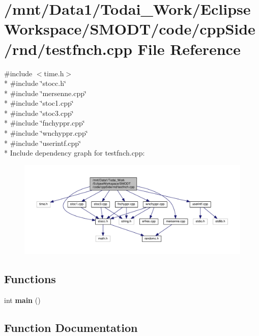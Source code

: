 \section{/mnt/\-Data1/\-Todai\-\_\-\-Work/\-Eclipse\-Workspace/\-S\-M\-O\-D\-T/code/cpp\-Side/rnd/testfnch.cpp File Reference}
\label{rnd_2testfnch_8cpp}
{\ttfamily \#include $<$time.\-h$>$}\\*
{\ttfamily \#include \char`\"{}stocc.\-h\char`\"{}}\\*
{\ttfamily \#include \char`\"{}mersenne.\-cpp\char`\"{}}\\*
{\ttfamily \#include \char`\"{}stoc1.\-cpp\char`\"{}}\\*
{\ttfamily \#include \char`\"{}stoc3.\-cpp\char`\"{}}\\*
{\ttfamily \#include \char`\"{}fnchyppr.\-cpp\char`\"{}}\\*
{\ttfamily \#include \char`\"{}wnchyppr.\-cpp\char`\"{}}\\*
{\ttfamily \#include \char`\"{}userintf.\-cpp\char`\"{}}\\*
Include dependency graph for testfnch.\-cpp\-:
\nopagebreak
\begin{figure}[H]
\begin{center}
\leavevmode
\includegraphics[width=350pt]{rnd_2testfnch_8cpp__incl}
\end{center}
\end{figure}
\subsection*{Functions}
\begin{DoxyCompactItemize}
\item 
int {\bf main} ()
\end{DoxyCompactItemize}


\subsection{Function Documentation}
